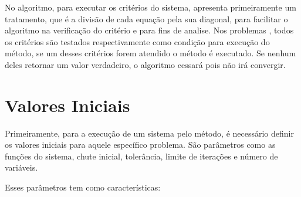 \documentclass[
12pt,				%
openright,			%
twoside,			%
a4paper,			%
english,			%
french,				%
spanish,			%
brazil				%
]{abntex2_new}
\begin{document}
		No algoritmo, para executar os critérios do sistema, apresenta 
		primeiramente um tratamento, que é a divisão de cada equação pela sua diagonal,
		para
		facilitar o algoritmo na verificação do critério e para fins de analise.
		Nos problemas , todos os critérios são testados respectivamente como condição
		para
		execução do método, se um desses critérios forem atendido o método é executado.
		Se nenhum deles retornar um valor verdadeiro, o algoritmo cessará pois não irá
		convergir.
		
		
		\section{Valores Iniciais}
		Primeiramente, para a execução de um sistema pelo método, é 
		necessário definir os valores iniciais para aquele 
		específico problema. São parâmetros como as funções do
		sistema,
		chute inicial, tolerância, limite de iterações e número
		de variáveis.
		
		Esses parâmetros tem como características:
		
\end{document}
